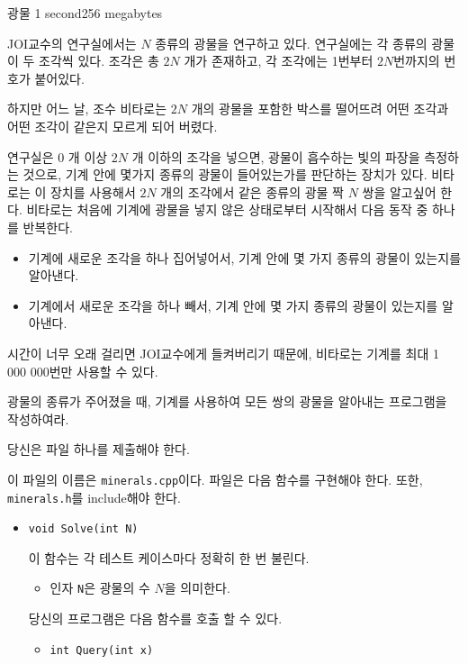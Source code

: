 \begin{problem}{광물}
	{}{}
	{1 second}{256 megabytes}{}
	
	JOI교수의 연구실에서는 $N$ 종류의 광물을 연구하고 있다. 연구실에는 각 종류의 광물이 두 조각씩 있다. 조각은 총 $2N$ 개가 존재하고, 각 조각에는 1번부터 $2N$번까지의 번호가 붙어있다.
	
	하지만 어느 날, 조수 비타로는 $2N$ 개의 광물을 포함한 박스를 떨어뜨려 어떤 조각과 어떤 조각이 같은지 모르게 되어 버렸다. 
	
	연구실은 $0$ 개 이상 $2N$ 개 이하의 조각을 넣으면, 광물이 흡수하는 빛의 파장을 측정하는 것으로, 기계 안에 몇가지 종류의 광물이 들어있는가를 판단하는 장치가 있다. 비타로는 이 장치를 사용해서 $2N$ 개의 조각에서 같은 종류의 광물 짝 $N$ 쌍을 알고싶어 한다. 비타로는 처음에 기계에 광물을 넣지 않은 상태로부터 시작해서 다음 동작 중 하나를 반복한다.
	
	\begin{itemize}
		\item 기계에 새로운 조각을 하나 집어넣어서, 기계 안에 몇 가지 종류의 광물이 있는지를 알아낸다.
		\item 기계에서 새로운 조각을 하나 빼서, 기계 안에 몇 가지 종류의 광물이 있는지를 알아낸다.
	\end{itemize}

	시간이 너무 오래 걸리면 JOI교수에게 들켜버리기 때문에, 비타로는 기계를 최대 1 000 000번만 사용할 수 있다.
	
	광물의 종류가 주어졌을 때, 기계를 사용하여 모든 쌍의 광물을 알아내는 프로그램을 작성하여라.
	
	
	\Specification
	
	당신은 파일 하나를 제출해야 한다.
	
	이 파일의 이름은 \texttt{minerals.cpp}이다. 파일은 다음 함수를 구현해야 한다. 또한, \texttt{minerals.h}를 include해야 한다.
	
	\begin{itemize}
		\item \texttt{void Solve(int N)}
		
		이 함수는 각 테스트 케이스마다 정확히 한 번 불린다.
		\begin{itemize}
			\item 인자 \texttt{N}은 광물의 수 $N$을 의미한다.
		\end{itemize}
		
		당신의 프로그램은 다음 함수를 호출 할 수 있다.
		\begin{itemize}
			\item \texttt{int Query(int x)}
			

\end{itemize}
\end{itemize}
\end{problem}
